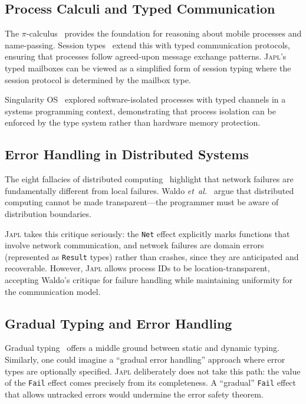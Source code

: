 \documentclass[11pt,twocolumn]{article}
\newcommand{\japl}{\textsc{Japl}}
\newcommand{\etal}{\emph{et~al.}}
\newcommand{\Fail}{\texttt{Fail}}
\newcommand{\Result}{\texttt{Result}}
\begin{document}
\subsection{Process Calculi and Typed Communication}

The $\pi$-calculus~\cite{milner1999communicating} provides the foundation for reasoning about mobile processes and name-passing. Session types~\cite{honda1993types,honda1998language} extend this with typed communication protocols, ensuring that processes follow agreed-upon message exchange patterns. \japl{}'s typed mailboxes can be viewed as a simplified form of session typing where the session protocol is determined by the mailbox type.

Singularity OS~\cite{hunt2007singularity} explored software-isolated processes with typed channels in a systems programming context, demonstrating that process isolation can be enforced by the type system rather than hardware memory protection.

\subsection{Error Handling in Distributed Systems}

The eight fallacies of distributed computing~\cite{deutsch1994eight} highlight that network failures are fundamentally different from local failures. Waldo \etal{}~\cite{waldo1997note} argue that distributed computing cannot be made transparent---the programmer must be aware of distribution boundaries.

\japl{} takes this critique seriously: the \texttt{Net} effect explicitly marks functions that involve network communication, and network failures are domain errors (represented as \Result{} types) rather than crashes, since they are anticipated and recoverable. However, \japl{} allows process IDs to be location-transparent, accepting Waldo's critique for failure handling while maintaining uniformity for the communication model.

\subsection{Gradual Typing and Error Handling}

Gradual typing~\cite{siek2006gradual} offers a middle ground between static and dynamic typing. Similarly, one could imagine a ``gradual error handling'' approach where error types are optionally specified. \japl{} deliberately does not take this path: the value of the \Fail{} effect comes precisely from its completeness. A ``gradual'' \Fail{} effect that allows untracked errors would undermine the error safety theorem.
\end{document}
